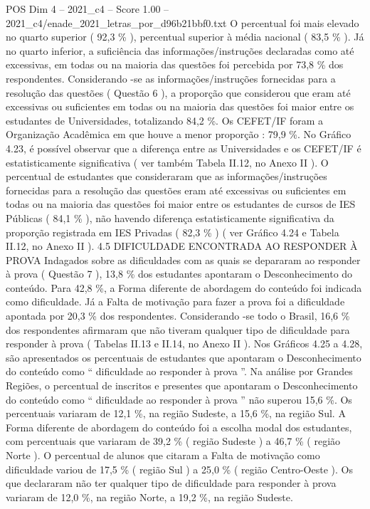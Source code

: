 \begin{textsample}{POS Dim 4 – 2021\_c4 – Score 1.00 – 2021\_c4/enade\_2021\_letras\_por\_d96b21bbf0.txt}
O percentual foi mais elevado no quarto superior ( 92,3 \% ), percentual superior à média nacional ( 83,5 \% ).
Já no quarto inferior, a suficiência das informações/instruções declaradas como até excessivas, em todas ou na maioria das questões foi percebida por 73,8 \% dos respondentes.
Considerando -se as informações/instruções fornecidas para a resolução das questões ( Questão 6 ), a proporção que considerou que eram até excessivas ou suficientes em todas ou na maioria das questões foi maior entre os estudantes de Universidades, totalizando 84,2 \%.
Os CEFET/IF foram a Organização Acadêmica em que houve a menor proporção : 79,9 \%.
No Gráfico 4.23, é possível observar que a diferença entre as Universidades e os CEFET/IF é estatisticamente significativa ( ver também Tabela II.12, no Anexo II ).
O percentual de estudantes que consideraram que as informações/instruções fornecidas para a resolução das questões eram até excessivas ou suficientes em todas ou na maioria das questões foi maior entre os estudantes de cursos de IES Públicas ( 84,1 \% ), não havendo diferença estatisticamente significativa da proporção registrada em IES Privadas ( 82,3 \% ) ( ver Gráfico 4.24 e Tabela II.12, no Anexo II ). 4.5 DIFICULDADE ENCONTRADA AO RESPONDER À PROVA Indagados sobre as dificuldades com as quais se depararam ao responder à prova ( Questão 7 ), 13,8 \% dos estudantes apontaram o Desconhecimento do conteúdo.
Para 42,8 \%, a Forma diferente de abordagem do conteúdo foi indicada como dificuldade.
Já a Falta de motivação para fazer a prova foi a dificuldade apontada por 20,3 \% dos respondentes.
Considerando -se todo o Brasil, 16,6 \% dos respondentes afirmaram que não tiveram qualquer tipo de dificuldade para responder à prova ( Tabelas II.13 e II.14, no Anexo II ).
Nos Gráficos 4.25 a 4.28, são apresentados os percentuais de estudantes que apontaram o Desconhecimento do conteúdo como “ dificuldade ao responder à prova ”.
Na análise por Grandes Regiões, o percentual de inscritos e presentes que apontaram o Desconhecimento do conteúdo como “ dificuldade ao responder à prova ” não superou 15,6 \%.
Os percentuais variaram de 12,1 \%, na região Sudeste, a 15,6 \%, na região Sul.
A Forma diferente de abordagem do conteúdo foi a escolha modal dos estudantes, com percentuais que variaram de 39,2 \% ( região Sudeste ) a 46,7 \% ( região Norte ).
O percentual de alunos que citaram a Falta de motivação como dificuldade variou de 17,5 \% ( região Sul ) a 25,0 \% ( região Centro-Oeste ).
Os que declararam não ter qualquer tipo de dificuldade para responder à prova variaram de 12,0 \%, na região Norte, a 19,2 \%, na região Sudeste.

\end{textsample}
